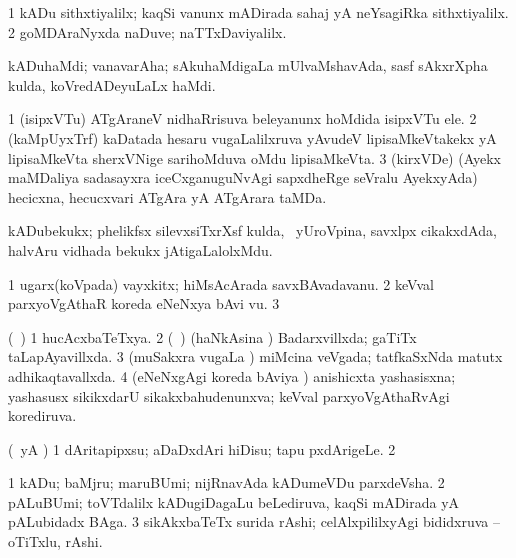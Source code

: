 {{{{{{\noindent 
\gl{\pagu}
\bmng
\bnum
\num{1}  kADu sithxtiyalilx; kaqSi \mo vanunx mADirada sahaj yA neYsagiRka sithxtiyalilx. 
\num{2}  goMDAraNyxda naDuve; naTTxDaviyalilx. 
\enum
\emng
\eentry

\bentry
{}
 \gl{\nA}\bmng
kADuhaMdi; vanavarAha; sAkuhaMdigaLa mUlvaMshavAda, sasf sAkxrXpha kulda, koVredADeyuLaLx haMdi. 
\emng
\eentry

\bentry
{}
 \gl{\nA}\bmng
\bnum
\num{1} (isipxVTu) ATgAraneV nidhaRrisuva beleyanunx hoMdida isipxVTu ele. 
\num{2} (kaMpUyxTrf) kaDatada hesaru \mo vugaLalilxruva yAvudeV lipisaMkeVtakekx yA lipisaMkeVta sherxVNige sarihoMduva oMdu lipisaMkeVta. 
\num{3} (kirxVDe) (Ayekx maMDaliya sadasayxra iceCxganuguNvAgi sapxdheRge seVralu AyekxyAda) hecicxna, hecucxvari ATgAra yA ATgArara taMDa. 
\enum
\emng
\eentry

\bentry
{}
  \gl{\nA}\bmng
kADubekukx; phelikfsx silevxsiTxrXsf kulda, \kanmu\ yUroVpina, savxlpx cikakxdAda, halvAru vidhada bekukx jAtigaLalolxMdu. 
\emng
\eentry

\bentry
{}
  \gl{\nA} \bmng
\bnum
\num{1} ugarx(koVpada) vayxkitx; hiMsAcArada savxBAvadavanu. 
\num{2} keVval parxyoVgAthaR koreda eNeNxya bAvi \mo vu. 
\num{3}  
\enum
\emng
\eentry

\bentry
{}
 \gl{\gu}
\expl{}
\bmng
(\kanmu\ \ame) 
\bnum
\num{1} hucAcxbaTeTxya. 
\num{2} (\kanmu\ \ame) (haNkAsina \vi) Badarxvillxda; gaTiTx taLapAyavillxda. 
\num{3} (muSakxra \mo vugaLa \vi) miMcina veVgada; tatfkaSxNda matutx adhikaqtavallxda. 
\num{4} (eNeNxgAgi koreda bAviya \vi) anishicxta yashasisxna; yashasusx sikikxdarU sikakxbahudenunxva; keVval parxyoVgAthaRvAgi korediruva. 
\enum
\emng
\eentry

\bentry
{}
  \gl{\nA}\bmng
{} 
\emng
\eentry

\bentry
{} 
\gl{\sakirx}
\expl{}
\bmng
(\pArxparx\ yA \kAparx) 
\bnum
\num{1} dAritapipxsu; aDaDxdAri hiDisu; tapu pxdArigeLe. 
\num{2}  
\enum
\emng
\eentry

\bentry
{} 
\gl{\nA}
\expl{}
\bmng
\bnum
\num{1} kADu; baMjru; maruBUmi; nijRnavAda kADumeVDu parxdeVsha. 
\num{2} pALuBUmi; toVTdalilx kADugiDagaLu beLediruva, kaqSi mADirada yA pALubidadx BAga. 
\num{3} sikAkxbaTeTx surida rAshi; celAlxpililxyAgi bididxruva -- oTiTxlu, rAshi. 
\enum
\emng

}}}}}}
